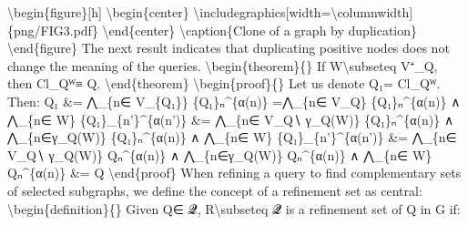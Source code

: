\documentclass{article}%
\begin{document}
\textbackslash{}begin\{figure\}{[}h{]}\newline%
\textbackslash{}begin\{center\}\newline%
\textbackslash{}includegraphics{[}width=\textbackslash{}columnwidth{]}\{png/FIG3.pdf\}\newline%
\textbackslash{}end\{center\}\newline%
\textbackslash{}caption\{Clone of a graph by duplication\}\newline%
\textbackslash{}end\{figure\}\newline%
\newline%
The next result indicates that duplicating positive nodes does not change the meaning of the queries.\newline%
\newline%
\textbackslash{}begin\{theorem\}\{\}\newline%
If W\textbackslash{}subseteq V⁺\_Q, then Cl\_Qᵂ≡ Q.\newline%
\textbackslash{}end\{theorem\}\newline%
\textbackslash{}begin\{proof\}\{\}\newline%
Let us denote Q₁= Cl\_Qᵂ. Then:\newline%
\newline%
Q₁ \&= ⋀\_\{n∈ V\_\{Q₁\}\} \{Q₁\}ₙ\^{}\{α(n)\}\newline%
=⋀\_\{n∈ V\_Q\} \{Q₁\}ₙ\^{}\{α(n)\} ∧ ⋀\_\{n∈ W\} \{Q₁\}\_\{n'\}\^{}\{α(n')\}\newline%
\newline%
\&= ⋀\_\{n∈ V\_Q∖ γ\_Q(W)\} \{Q₁\}ₙ\^{}\{α(n)\} ∧ ⋀\_\{n∈γ\_Q(W)\} \{Q₁\}ₙ\^{}\{α(n)\} ∧ ⋀\_\{n∈ W\} \{Q₁\}\_\{n'\}\^{}\{α(n')\}\newline%
\newline%
\&= ⋀\_\{n∈ V\_Q∖ γ\_Q(W)\} Qₙ\^{}\{α(n)\} ∧ ⋀\_\{n∈γ\_Q(W)\} Qₙ\^{}\{α(n)\} ∧ ⋀\_\{n∈ W\} Qₙ\^{}\{α(n)\}\newline%
\newline%
\&= Q\newline%
\newline%
\textbackslash{}end\{proof\}\newline%
\newline%
When refining a query to find complementary sets of selected subgraphs, we define the concept of a refinement set as central:\newline%
\newline%
\textbackslash{}begin\{definition\}\{\}\newline%
Given Q∈ 𝓠, R\textbackslash{}subseteq 𝓠 is a refinement set of Q in G if:\newline%
\end{document}
